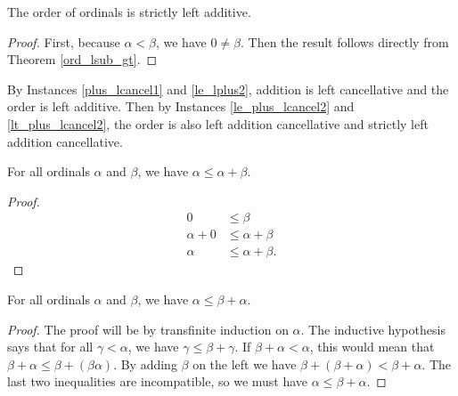 \documentclass[../../math.tex]{subfiles}
\begin{document}
\begin{instance}
    The order of ordinals is strictly left additive.
\end{instance}
\begin{proof}
    First, because $\alpha < \beta$, we have $0 \neq \beta$.  Then the result
    follows directly from Theorem \ref{ord_lsub_gt}.
\end{proof}

By Instances \ref{plus_lcancel1} and \ref{le_lplus2}, addition is left
cancellative and the order is left additive.  Then by Instances
\ref{le_plus_lcancel2} and \ref{lt_plus_lcancel2}, the order is also left
addition cancellative and strictly left addition cancellative.

\begin{theorem} \label{ord_le_self_rplus}
    For all ordinals $\alpha$ and $\beta$, we have $\alpha \leq \alpha + \beta$.
\end{theorem}
\begin{proof}
    \begin{align*}
        0 & \leq \beta \\
        \alpha + 0 &\leq \alpha + \beta \\
        \alpha &\leq \alpha + \beta.
    \end{align*}
\end{proof}

\begin{theorem} \label{ord_le_self_lplus}
    For all ordinals $\alpha$ and $\beta$, we have $\alpha \leq \beta + \alpha$.
\end{theorem}
\begin{proof}
    The proof will be by transfinite induction on $\alpha$.  The inductive
    hypothesis says that for all $\gamma < \alpha$, we have $\gamma \leq \beta +
    \gamma$.  If $\beta + \alpha < \alpha$, this would mean that $\beta + \alpha
    \leq \beta + (\beta \alpha)$.  By adding $\beta$ on the left we have $\beta
    + (\beta + \alpha) < \beta + \alpha$.  The last two inequalities are
    incompatible, so we must have $\alpha \leq \beta + \alpha$.
\end{proof}
\end{document}
